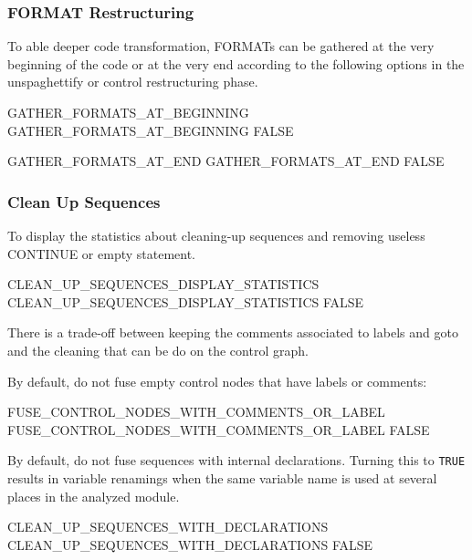 \documentclass[a4paper]{report}
\begin{document}
\subsubsection*{FORMAT Restructuring}

To able deeper code transformation, FORMATs can be gathered at the
very beginning of the code or at the very end according to the
following options in the unspaghettify or control restructuring phase.
\begin{PipsProp}{GATHER_FORMATS_AT_BEGINNING}
GATHER_FORMATS_AT_BEGINNING FALSE
\end{PipsProp}
\begin{PipsProp}{GATHER_FORMATS_AT_END}
GATHER_FORMATS_AT_END FALSE
\end{PipsProp}


\subsubsection*{Clean Up Sequences}

To display the statistics about cleaning-up sequences and removing
useless CONTINUE or empty statement.
\begin{PipsProp}{CLEAN_UP_SEQUENCES_DISPLAY_STATISTICS}
CLEAN_UP_SEQUENCES_DISPLAY_STATISTICS FALSE
\end{PipsProp}

There is a trade-off between keeping the comments associated to labels and
goto and the cleaning that can be do on the control graph.

By default, do not fuse empty control nodes that have labels or comments:
\begin{PipsProp}{FUSE_CONTROL_NODES_WITH_COMMENTS_OR_LABEL}
FUSE_CONTROL_NODES_WITH_COMMENTS_OR_LABEL FALSE
\end{PipsProp}

By default, do not fuse sequences with internal declarations. Turning
this to \texttt{TRUE} results in variable renamings when the same
variable name is used at several places in the analyzed module.
\begin{PipsProp}{CLEAN_UP_SEQUENCES_WITH_DECLARATIONS}
CLEAN_UP_SEQUENCES_WITH_DECLARATIONS FALSE
\end{PipsProp}




\end{document}
